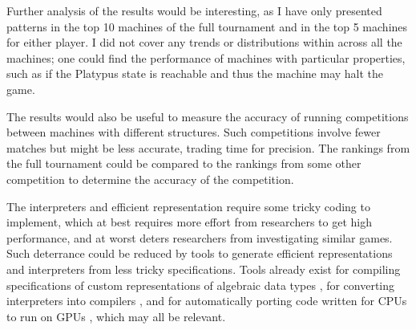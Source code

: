 Further analysis of the results would be interesting, as I have only presented
patterns in the top 10 machines of the full tournament and in the top 5
machines for either player. I did not cover any trends or distributions within
across all the machines; one could find the performance of machines with
particular properties, such as if the Platypus state is reachable and thus the
machine may halt the game.

The results would also be useful to measure the accuracy of running
competitions between machines with different structures. Such competitions
involve fewer matches but might be less accurate, trading time for precision.
The rankings from the full tournament could be compared to the rankings
from some other competition to determine the accuracy of the competition.

The interpreters and efficient representation require some tricky coding to
implement, which at best requires more effort from researchers to get high
performance, and at worst deters researchers from investigating similar
games. Such deterrance could be reduced by tools to generate efficient
representations and interpreters from less tricky specifications. Tools
already exist for compiling specifications of custom representations of
algebraic data types \cite{bit-stealing}, for converting interpreters
into compilers \cite{meta-compilation}, and for automatically porting
code written for CPUs to run on GPUs \cite{gpu-first}, which may all
be relevant.
